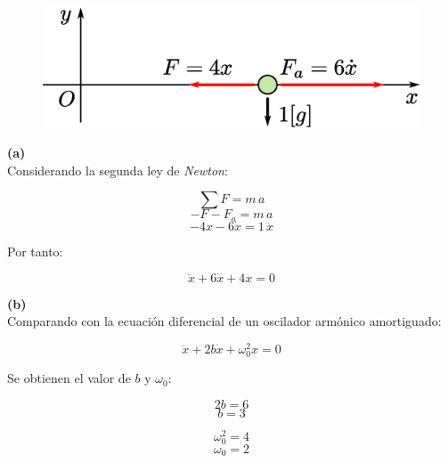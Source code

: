 \documentclass[letter,11pt]{article}
\begin{document}
\begin{figure}[!h]
\centering
\includegraphics[scale=0.40]{resources/f2.eps}
\end{figure}

\textbf{(a)} \\

Considerando la segunda ley de \emph{Newton}:

\begin{equation*}
    \sum F = m\, a
\end{equation*}
\begin{equation*}
    - F - F_a = m\, a
\end{equation*}
\begin{equation*}
    - 4x - 6\dot{x} = 1\, \ddot{x}
\end{equation*}

Por tanto:

\begin{equation}
    \ddot{x} + 6 \dot{x} + 4 x = 0
\end{equation}

\textbf{(b)} \\

Comparando con la ecuación diferencial de un oscilador armónico amortiguado:

\begin{equation*}
    \ddot{x} + 2b\dot{x} + \omega^2_0x=0
\end{equation*}

Se obtienen el valor de $b$ y $\omega_0$:

\begin{equation*}
    2b = 6
\end{equation*}
\begin{equation}
    b = 3
\end{equation}

\begin{equation*}
    \omega^2_0 = 4
\end{equation*}
\begin{equation}
    \omega_0 = 2
\end{equation}
\end{document}
